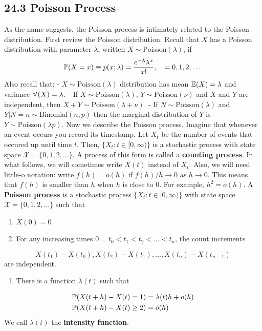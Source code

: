 \subsection*{24.3 Poisson Process}\label{poisson-process}
As the name suggests, the Poisson process is intimately related to the
Poisson distribution. First review the Poisson distribution.
Recall that \(X\) has a Poisson distribution with parameter \(\lambda\),
written \(X \sim \text{Poisson}(\lambda)\), if
\[
\operatorname{\mathbb{P}}(X = x) \equiv p(x; \lambda) = \frac{e^{-\lambda} \lambda^x}{x!}, \quad = 0, 1, 2, \dots
\]
Also recall that: - \(X \sim \text{Poisson}(\lambda)\) distribution has
mean \(\operatorname{\mathbb{E}}(X) = \lambda\) and variance
\(\operatorname{\mathbb{V}}(X) = \lambda\). - If \(X \sim \text{Poisson}(\lambda)\),
\(Y \sim \text{Poisson}(\nu)\) and \(X\) and \(Y\) are independent, then
\(X + Y \sim \text{Poisson}(\lambda + \nu)\). - If
\(N \sim \text{Poisson}(\lambda)\) and
\(Y | N = n \sim \text{Binomial}(n, p)\) then the marginal distribution
of \(Y\) is \(Y \sim \text{Poisson}(\lambda p)\).
Now we describe the Poisson process. Imagine that whenever an event
occurs you record its timestamp. Let \(X_t\) be the number of events
that occured up until time \(t\). Then,
\(\{ X_t : t \in [0, \infty) \}\) is a stochastic process with state
space \(\mathcal{X} = \{ 0, 1, 2, \dots \}\). A process of this form is
called a \textbf{counting process}.
In what follows, we will sometimes write \(X(t)\) instead of \(X_t\).
Also, we will need little-o notation: write \(f(h) = o(h)\) if
\(f(h) / h \rightarrow 0\) as \(h \rightarrow 0\). This means that
\(f(h)\) is smaller than \(h\) when \(h\) is close to 0. For example,
\(h^{2} = o(h)\).
A \textbf{Poisson process} is a stochastic process
\(\{ X_t : t \in [0, \infty) \}\) with state space
\(\mathcal{X} = \{ 0, 1, 2, \dots \}\) such that
\begin{enumerate}[tightlist,label={\arabic*.}]
\item
  \(X(0) = 0\)
\item
  For any increasing times \(0 = t_{0} < t_{1} < t_{2} < \dots < t_{n}\), the
  count increments
\end{enumerate}
\[
X(t_{1}) - X(t_{0}), X(t_{2}) - X(t_{1}), \dots, X(t_{n}) - X(t_{n - 1})
\]
are independent.
\begin{enumerate}[tightlist,label={\arabic*.},resume]
\item
  There is a function \(\lambda(t)\) such that
\end{enumerate}
\begin{align*}
\PROB\left(X(t + h) - X(t) = 1\right) &= \lambda(t)h + o(h) \\
\PROB\left(X(t + h) - X(t) \geq 2\right) &= o(h)
\end{align*}
We call \(\lambda(t)\) the \textbf{intensity function}.

